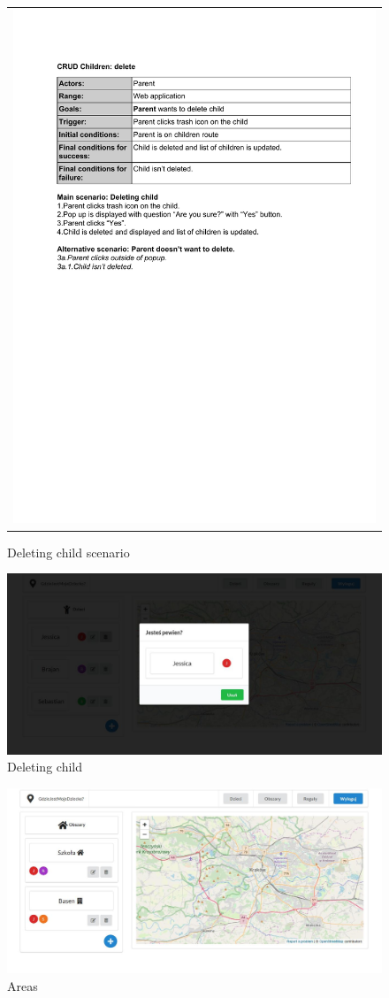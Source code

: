\documentclass{sprawozdanie-agh}
\begin{document}
		\begin{figure}[H] 
			\centering
			\begin{tabular}{c}
				\includegraphics[width=.80\textwidth]{deC_cropped} 
			\end{tabular} 
		\caption{Deleting child scenario}
		\end{figure}

		\begin{figure}[H]
			\centering
			\includegraphics[width=.80\textwidth]{deleteChild}
			\caption{Deleting child}
		\end{figure}

		\begin{figure}[H]
			\centering
			\includegraphics[width=.80\textwidth]{areas}
			\caption{Areas}
		\end{figure}
\end{document}
